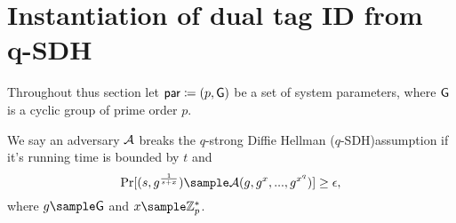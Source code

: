 \section{Instantiation of dual tag ID from q-SDH}
Throughout thus section let $\mathsf{par} \coloneqq (p,\mathsf{G}) $ be a set of system parameters, where 
$\mathsf{G} $ is a cyclic group of prime order $p$.

\begin{definition}
We say an adversary $\mathcal{A}$ breaks the $q$-strong Diffie Hellman ($q$-SDH)assumption if it's running time is bounded by $t$ and
$$\Pr[(s,g^{\frac{1}{s+x}}) \sample \adv(g,g^x,...,g^{x^q})] \geq \epsilon,$$
where 
$g \sample \G$ and $x \sample \mathbb{Z}_p^*$.
\end{definition}

\begin{figure}[htb!]
    \centering
    \nicoresetlinenr
\end{figure}
